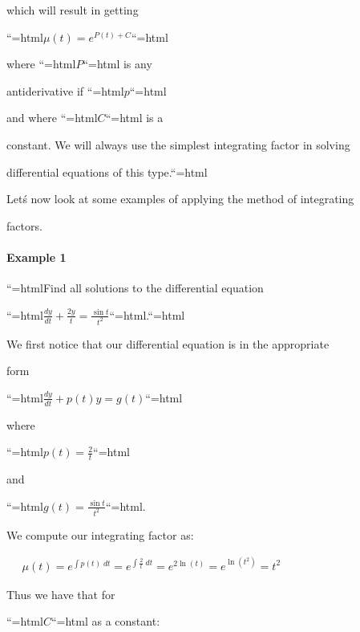 which will result in getting

``{=html}$\mu (t) = e^{P(t) + C}$``{=html}

where ``{=html}$P$``{=html} is any

antiderivative if ``{=html}$p$``{=html}

and where ``{=html}$C$``{=html} is a

constant. We will always use the simplest integrating factor in solving

differential equations of this type.``{=html}



Let\'s now look at some examples of applying the method of integrating

factors.



\paragraph{Example 1}



``{=html}Find all solutions to the differential equation

``{=html}$\frac{dy}{dt} + \frac{2y}{t} = \frac{\sin t}{t^2}$``{=html}.``{=html}



We first notice that our differential equation is in the appropriate

form

``{=html}$\frac{dy}{dt} + p(t) y = g(t)$``{=html}

where

``{=html}$p(t) = \frac{2}{t}$``{=html}

and

``{=html}$g(t) = \frac{\sin t}{t^2}$``{=html}.

We compute our integrating factor as:







$\begin{aligned} \quad \mu (t) = e^{\int p(t) \; dt} = e^{\int \frac{2}{t} \; dt} = e^{2 \ln (t)} = e^{\ln (t^2)} = t^2 \end{aligned}$







Thus we have that for

``{=html}$C$``{=html} as a constant:







